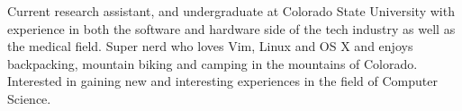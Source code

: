 

\begin{cvparagraph}

Current research assistant, and undergraduate at Colorado State University with experience 
in both the software and hardware side of the tech industry as well as the medical field. 
Super nerd who loves Vim, Linux and OS X and enjoys backpacking, mountain biking and 
camping in the mountains of Colorado. Interested in gaining new and interesting experiences 
in the field of Computer Science.
\end{cvparagraph}
